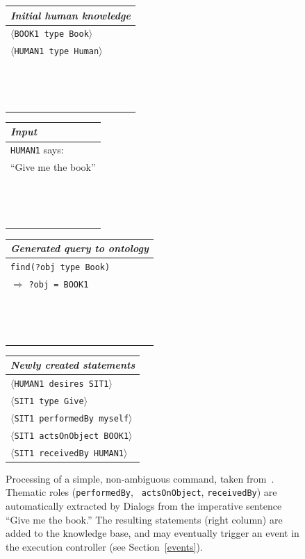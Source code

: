 \documentclass[preprint,3p,times]{elsarticle}
\newcommand{\concept}[1]{{\small \texttt{#1}}}
\newcommand{\stmt}[1]{{\footnotesize\tt$\langle$#1\relax$\rangle$}}
\begin{document}
\begin{figure}
    \centering
    \begin{tabular}{l}
        \emph{Initial human knowledge} \\
        \hline
        \stmt{BOOK1 type Book} \\
        \stmt{HUMAN1 type Human} \\
        ~\\
        ~\\
        ~\\
    \end{tabular}
    \begin{tabular}{l}
        \emph{Input}\\

        \hline

        \concept{HUMAN1} says:\\
        ``Give me the book'' \\
        ~\\
        ~\\
        ~\\

    \end{tabular}
    \begin{tabular}{l}

        \emph{Generated query to ontology} \\
        \hline
        \concept{find(?obj type Book)} \\ 
        \hspace{0.2cm}$\Rightarrow$ \concept{?obj = BOOK1} \\
        ~\\
        ~\\
        ~\\
    \end{tabular}
    \begin{tabular}{l}

        \emph{Newly created statements}\\
        \hline
        \stmt{HUMAN1 desires SIT1} \\
         \stmt{SIT1 type Give} \\
         \stmt{SIT1 performedBy myself} \\
         \stmt{SIT1 actsOnObject BOOK1} \\
         \stmt{SIT1 receivedBy HUMAN1} \\
    \end{tabular}

    \caption{Processing of a simple, non-ambiguous command, taken
        from~\cite{Lemaignan2011a}. Thematic roles ({\tt performedBy}, {\tt
        actsOnObject}, {\tt receivedBy}) are automatically extracted by 
    {\sc Dialogs} from the imperative sentence ``Give me the book.'' The 
    resulting statements (right column) are added to the knowledge base, and
    may eventually trigger an event in the execution controller (see
    Section~\ref{events}).}

    \label{dialogs|ex}
\end{figure}
\end{document}
